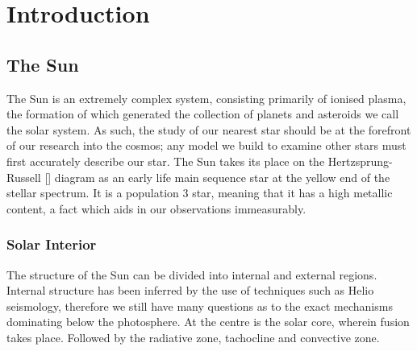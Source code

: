 
\newcommand{\pd}[2]{\frac{\partial #1}{\partial #2 }}
\newcommand{\td}[2]{\frac{d #1}{d #2 }}
\newcommand{\mb}[1]{\mathbf{#1}}
\newcommand{\divv}[1]{\bigtriangledown{#1}}
\newcommand{\del}{\bigtriangledown}

\label{ch:Intro}
\chapter{Introduction}  %





\section{The Sun}
The Sun is an extremely complex system, consisting primarily of ionised plasma, the formation of which generated the collection of planets and asteroids we call the solar system.
As such, the study of our nearest star should be at the forefront of our research into the cosmos; any model we build to examine other stars must first accurately describe our star. 
The Sun takes its place on the Hertzsprung-Russell [\cite{Hertzsprung1909, Russell1914}] diagram as an early life main sequence star at the yellow end of the stellar spectrum.
It is a population 3 star, meaning that it has a high metallic content, a fact which aids in our observations immeasurably.

\subsection{Solar Interior}

The structure of the Sun can be divided into internal and external regions.
Internal structure has been inferred by the use of techniques such as Helio seismology, therefore we still have many questions as to the exact mechanisms dominating below the photosphere.
At the centre is the solar core, wherein fusion takes place. 
Followed by the radiative zone, tachocline and convective zone.

